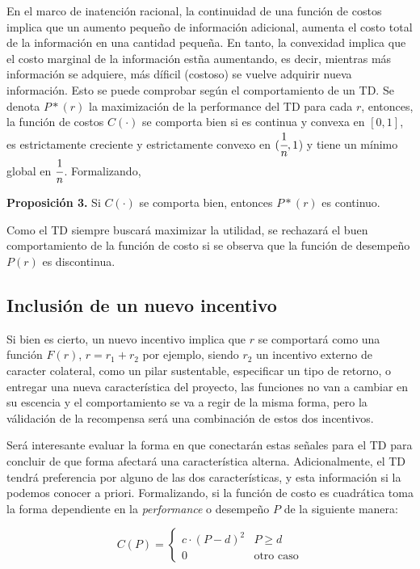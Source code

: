 \documentclass[11pt,letterpaper]{article}
\begin{document}
En el marco de inatención racional, la continuidad de una función de costos implica que un aumento pequeño de información adicional, aumenta el costo total de la información en una cantidad pequeña. En tanto, la convexidad implica que el costo marginal de la información estña aumentando, es decir, mientras más información se adquiere, más díficil (costoso) se vuelve adquirir nueva información. Esto se puede comprobar según el comportamiento de un TD. Se denota $P * (r)$ la maximización de la performance del TD para cada $r$, entonces, la función de costos $C(\cdot)$ se comporta bien si es continua y convexa en $[0,1]$, es estrictamente creciente y estrictamente convexo en $(\cfrac{1}{n},1$) y tiene un mínimo global en $\cfrac{1}{n}$. Formalizando,

\vspace{0,5cm}

\textbf{Proposición 3.} Si $C(\cdot)$ se comporta bien, entonces $P*(r)$ es continuo.

\vspace{0,5cm}

Como el TD siempre buscará maximizar la utilidad, se rechazará el buen comportamiento de la función de costo si se observa que la función de desempeño $P(r)$ es discontinua.

\subsection{Inclusión de un nuevo incentivo}

Si bien es cierto, un nuevo incentivo implica que $r$ se comportará como una función $F(r)$, $r = r_1 + r_2$ por ejemplo, siendo $r_2$ un incentivo externo de caracter colateral, como un pilar sustentable, especificar un tipo de retorno, o entregar una nueva característica del proyecto, las funciones no van a cambiar en su escencia y el comportamiento se va a regir de la misma forma, pero la válidación de la recompensa será una combinación de estos dos incentivos. 

Será interesante evaluar la forma en que conectarán estas señales para el TD para concluir de que forma afectará una característica alterna. Adicionalmente, el TD tendrá preferencia por alguno de las dos características, y esta información si la podemos conocer a priori. Formalizando, si la función de costo es cuadrática toma la forma dependiente en la \emph{performance} o desempeño $P$ de la siguiente manera:

$$C(P)=\begin{cases}c\cdot(P-d)^2& P\geq d\\ 0&\text{otro caso}\end{cases}$$
\end{document}
